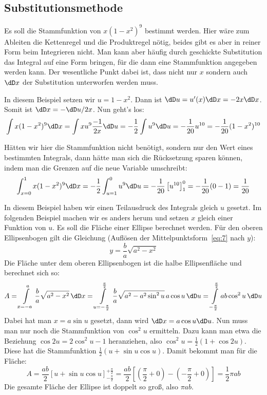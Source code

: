 \subsection{Substitutionsmethode}
Es soll die Stammfunktion von $x(1-x^2)^9$ bestimmt werden. Hier wäre zum
Ableiten die Kettenregel und die Produktregel nötig, beides gibt es aber in
reiner Form beim Integrieren nicht. Man kann aber häufig durch geschickte
Substitution das Integral auf eine Form bringen, für die dann eine
Stammfunktion angegeben werden kann. Der wesentliche Punkt dabei ist, dass
nicht nur $x$ sondern auch $\dD x$ der Substitution unterworfen werden muss.

In diesem Beispiel setzen wir $u=1-x^2$. Dann ist $\dD u=u'(x)\dD x=-2x\dD x$.
Somit ist $\dD x=-\dD u/2x$. Nun geht's los:
\[
\int x(1-x^2)^9\dD x=\int x u^9 \frac{-1}{2x}\dD u
=-\frac{1}{2}\int u^9\dD u=-\frac{1}{20}u^{10}=-\frac{1}{20}(1-x^2)^{10}
\]

Hätten wir hier die Stammfunktion nicht benötigt, sondern nur den Wert eines
bestimmten Integrals, dann hätte man sich die Rücksetzung sparen können, indem
man die Grenzen auf die neue Variable umschreibt:
\[
\int_{x=0}^1 x(1-x^2)^9\dD x=-\frac{1}{2}\int_{u=1}^0u^9\dD u
=-\frac{1}{20}\left[u^{10}\right]_1^0=-\frac{1}{20}(0-1)=\frac{1}{20}
\]

In diesem Beispiel haben wir einen Teilausdruck des Integrals gleich $u$
gesetzt. Im folgenden Beispiel machen wir es anders herum und setzen $x$
gleich einer Funktion von $u$. Es soll die Fläche einer Ellipse berechnet
werden. Für den oberen Ellipsenbogen gilt die Gleichung (Auflösen der
Mittelpunktsform~\eqref{eq:7} nach $y$):
\[
y=\frac{b}{a}\sqrt{a^2-x^2}
\]
Die Fläche unter dem oberen Ellipsenbogen ist die halbe Ellipsenfläche und
berechnet sich so:
\[
A=\int\limits_{x=-a}^a \frac{b}{a}\sqrt{a^2-x^2}\,\dD x=
\int\limits_{u=-\frac{\pi}{2}}^{\frac{\pi}{2}}
\frac{b}{a}\sqrt{a^2-a^2\sin^2u}\,a\cos u\,\dD u=
\int\limits_{-\frac{\pi}{2}}^{\frac{\pi}{2}}ab\cos^2u\,\dD u
\]
Dabei hat man $x=a\sin u$ gesetzt, dann wird $\dD x=a\cos u \dD u$. Nun muss
man nur noch die Stammfunktion von $\cos^2u$ ermitteln. Dazu kann man etwa die
Beziehung $\cos2u=2\cos^2u-1$ heranziehen, also
$\cos^2u=\frac{1}{2}(1+\cos2u)$. Diese hat die Stammfunktion
$\frac{1}{2}(u+\sin u\cos u)$. Damit bekommt man für die Fläche:
\[
A=\frac{ab}{2}\left[u+\sin u\cos u\right]_{-\frac{\pi}{2}}^{+\frac{\pi}{2}}=
\frac{ab}{2}[(\frac{\pi}{2}+0)-(-\frac{\pi}{2}+0)]=\frac{1}{2}\pi a b
\]
Die gesamte Fläche der Ellipse ist doppelt so groß, also $\pi a b$.

